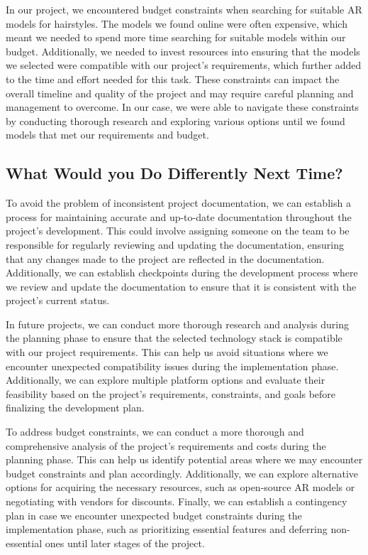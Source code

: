 \documentclass{article}
\begin{document}
In our project, we encountered budget constraints when searching for suitable AR models for hairstyles. The models we found online were often expensive, which meant we needed to spend more time searching for suitable models within our budget. Additionally, we needed to invest resources into ensuring that the models we selected were compatible with our project's requirements, which further added to the time and effort needed for this task. These constraints can impact the overall timeline and quality of the project and may require careful planning and management to overcome. In our case, we were able to navigate these constraints by conducting thorough research and exploring various options until we found models that met our requirements and budget.

\subsection{What Would you Do Differently Next Time?}
To avoid the problem of inconsistent project documentation, we can establish a process for maintaining accurate and up-to-date documentation throughout the project's development. This could involve assigning someone on the team to be responsible for regularly reviewing and updating the documentation, ensuring that any changes made to the project are reflected in the documentation. Additionally, we can establish checkpoints during the development process where we review and update the documentation to ensure that it is consistent with the project's current status.

In future projects, we can conduct more thorough research and analysis during the planning phase to ensure that the selected technology stack is compatible with our project requirements. This can help us avoid situations where we encounter unexpected compatibility issues during the implementation phase. Additionally, we can explore multiple platform options and evaluate their feasibility based on the project's requirements, constraints, and goals before finalizing the development plan.

To address budget constraints, we can conduct a more thorough and comprehensive analysis of the project's requirements and costs during the planning phase. This can help us identify potential areas where we may encounter budget constraints and plan accordingly. Additionally, we can explore alternative options for acquiring the necessary resources, such as open-source AR models or negotiating with vendors for discounts. Finally, we can establish a contingency plan in case we encounter unexpected budget constraints during the implementation phase, such as prioritizing essential features and deferring non-essential ones until later stages of the project.
\end{document}

